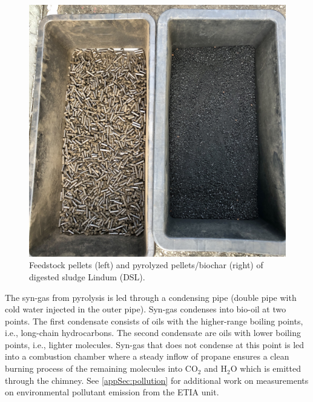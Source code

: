 \begin{figure}
    \centering
    \includegraphics[width=0.6\linewidth,scale=0.6]{Bilder/Pyrolysis/Pellets.png}
    \caption{Feedstock pellets (left) and pyrolyzed pellets/biochar (right) of digested sludge Lindum (DSL).}
    \label{fig:pellets}
\end{figure}

The syn-gas from pyrolysis is led through a condensing pipe (double pipe with cold water injected in the outer pipe). Syn-gas condenses into bio-oil at two points. The first condensate consists of oils with the higher-range boiling points, i.e., long-chain hydrocarbons. The second condensate are oils with lower boiling points, i.e., lighter molecules. Syn-gas that does not condense at this point is led into a combustion chamber where a steady inflow of propane ensures a clean burning process of the remaining molecules into CO$_2$ and H$_2$O which is emitted through the chimney. See \cref{appSec:pollution} for additional work on measurements on environmental pollutant emission from the ETIA unit.

